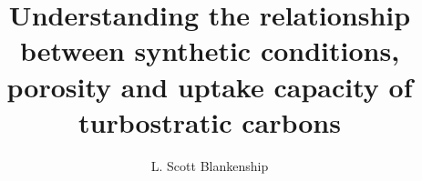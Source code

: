 \documentclass[a4paper,12pt,oneside]{report}
\begin{document}
\symbolfootnote
{}

\title{Understanding the relationship between synthetic conditions, porosity and  uptake capacity of turbostratic carbons}

\makeatletter
\let\inserttitle\@title
\makeatother

\author{L. Scott Blankenship}

\normallinespacing
\maketitle

\preface








\newpage
\tableofcontents

\frontpagestyle


\mainpagestyle





%






\end{document}
